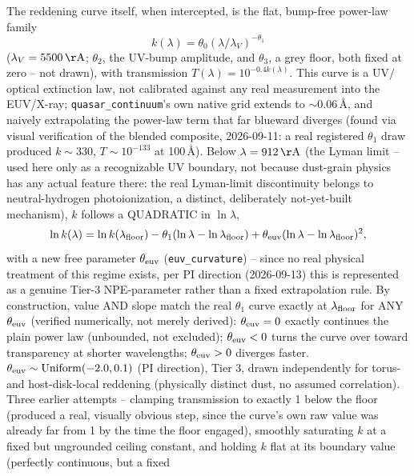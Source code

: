 \documentclass{aastex7}
\begin{document}
The reddening curve itself, when intercepted, is the flat, bump-free
power-law family
\begin{equation}
    k(\lambda) = \theta_0 (\lambda/\lambda_V)^{-\theta_1}
\end{equation}
($\lambda_V = 5500\,\mathrm{\AA}$; $\theta_2$, the UV-bump amplitude, and
$\theta_3$, a grey floor, both fixed at zero -- not drawn), with
transmission $T(\lambda) = 10^{-0.4 k(\lambda)}$. This curve is a UV/
optical extinction law, not calibrated against any real measurement into
the EUV/X-ray; \texttt{quasar\_continuum}'s own native grid extends to
$\sim$0.06\,\AA{}, and naively extrapolating the power-law term that far
blueward diverges (found via visual verification of the blended
composite, 2026-09-11: a real registered $\theta_1$ draw produced
$k\sim330$, $T\sim10^{-133}$ at 100\,\AA{}). Below $\lambda=912\,
\mathrm{\AA}$ (the Lyman limit -- used here only as a recognizable UV
boundary, not because dust-grain physics has any actual feature there:
the real Lyman-limit discontinuity belongs to neutral-hydrogen
photoionization, a distinct, deliberately not-yet-built mechanism), $k$
follows a QUADRATIC in $\ln\lambda$,
\begin{equation}
    \ln k(\lambda) = \ln k(\lambda_{\rm floor}) - \theta_1 (\ln\lambda - \ln\lambda_{\rm floor})
                       + \theta_{\rm euv} (\ln\lambda - \ln\lambda_{\rm floor})^2,
\end{equation}
with a new free parameter $\theta_{\rm euv}$
(\texttt{euv\_curvature}) -- since no real physical treatment of this
regime exists, per PI direction (2026-09-13) this is represented as a
genuine Tier-3 NPE-parameter rather than a fixed extrapolation rule. By
construction, value AND slope match the real $\theta_1$ curve exactly at
$\lambda_{\rm floor}$ for ANY $\theta_{\rm euv}$ (verified numerically,
not merely derived): $\theta_{\rm euv}=0$ exactly continues the plain
power law (unbounded, not excluded); $\theta_{\rm euv}<0$ turns the curve
over toward transparency at shorter wavelengths; $\theta_{\rm euv}>0$
diverges faster. $\theta_{\rm euv} \sim \mathrm{Uniform}(-2.0, 0.1)$ (PI
direction), Tier 3, drawn independently for torus- and host-disk-local
reddening (physically distinct dust, no assumed correlation). Three
earlier attempts -- clamping transmission to exactly 1 below the floor
(produced a real, visually obvious step, since the curve's own raw value
was already far from 1 by the time the floor engaged), smoothly
saturating $k$ at a fixed but ungrounded ceiling constant, and holding $k$
flat at its boundary value (perfectly continuous, but a fixed
\end{document}
